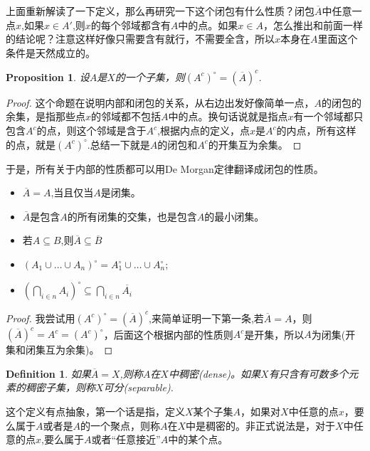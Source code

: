 \documentclass{article}
\newtheorem{proposition}[theorem]{Proposition}
\newtheorem{definition}[theorem]{Definition}
\begin{document}
上面重新解读了一下定义，那么再研究一下这个闭包有什么性质？闭包$\overline{A}$中任意一点$x$,如果$x \in A'$,则$x$的每个邻域都含有$A$中的点。如果$x \in A$，怎么推出和前面一样的结论呢？注意这样好像只需要含有就行，不需要全含，所以$x$本身在$A$里面这个条件是天然成立的。

\begin{proposition}
设$A$是$X$的一个子集，则$(A^{c})^{\circ}=(\overline{A})^c$.
\end{proposition}

\begin{proof}
这个命题在说明内部和闭包的关系，从右边出发好像简单一点，$A$的闭包的余集，是指那些点$x$的邻域都不包括$A$中的点。换句话说就是指点$x$有一个邻域都只包含$A^c$的点，则这个邻域是含于$A^c$,根据内点的定义，点$x$是$A^c$的内点，所有这样的点，就是$(A^c)^{\circ}$.总结一下就是$A$的闭包和$A^c$的开集互为余集。	
\end{proof}

于是，所有关于内部的性质都可以用De Morgan定律翻译成闭包的性质。

\begin{itemize}
	\item $\overline{A} = A$,当且仅当$A$是闭集。
	\item $\overline{A}$是包含$A$的所有闭集的交集，也是包含$A$的最小闭集。
	\item 若$A \subseteq B$,则$\overline{A} \subseteq \overline{B}$
	\item $(A_1 \cup \ldots \cup A_n)^{\circ}=A_1^{\circ} \cup \ldots \cup A_n^{\circ}$;
	\item ${\left(\bigcap\limits_{i \in n} A_i\right)}^{\circ} \subseteq \bigcap\limits_{i \in n} \overline{A_i}$
\end{itemize}

\begin{proof}
我尝试用$(A^{c})^{\circ}=(\overline{A})^c$,来简单证明一下第一条,若$\overline{A}=A$，则$(\overline{A})^c = A^c=(A^{c})^{\circ}$，后面这个根据内部的性质则$A^c$是开集，所以$A$为闭集(开集和闭集互为余集)。
\end{proof}


\begin{definition}
如果$\overline{A}=X$,则称$A$在$X$中稠密(dense)。如果$X$有只含有可数多个元素的稠密子集，则称$X$可分(separable).
\end{definition}

这个定义有点抽象，第一个话是指，定义$X$某个子集$A$，如果对$X$中任意的点$x$，要么属于$A$或者是$A$的一个聚点，则称$A$在$X$中是稠密的。非正式说法是，对于$X$中任意的点$x$,要么属于$A$或者“任意接近”$A$中的某个点。
\end{document}
